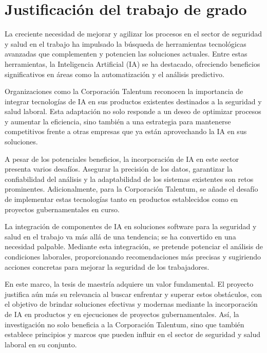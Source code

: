 \section{Justificación del trabajo de grado}
La creciente necesidad de mejorar y agilizar los procesos en el sector de seguridad y salud en el trabajo ha impulsado la búsqueda de herramientas tecnológicas avanzadas que complementen y potencien las soluciones actuales. Entre estas herramientas, la Inteligencia Artificial (IA) se ha destacado, ofreciendo beneficios significativos en áreas como la automatización y el análisis predictivo.

Organizaciones como la Corporación Talentum reconocen la importancia de integrar tecnologías de IA en sus productos existentes destinados a la seguridad y salud laboral. Esta adaptación no solo responde a un deseo de optimizar procesos y aumentar la eficiencia, sino también a una estrategia para mantenerse competitivos frente a otras empresas que ya están aprovechando la IA en sus soluciones.

A pesar de los potenciales beneficios, la incorporación de IA en este sector presenta varios desafíos. Asegurar la precisión de los datos, garantizar la confiabilidad del análisis y la adaptabilidad de los sistemas existentes son retos prominentes. Adicionalmente, para la Corporación Talentum, se añade el desafío de implementar estas tecnologías tanto en productos establecidos como en proyectos gubernamentales en curso.

La integración de componentes de IA en soluciones software para la seguridad y salud en el trabajo va más allá de una tendencia; se ha convertido en una necesidad palpable. Mediante esta integración, se pretende potenciar el análisis de condiciones laborales, proporcionando recomendaciones más precisas y sugiriendo acciones concretas para mejorar la seguridad de los trabajadores.

En este marco, la tesis de maestría adquiere un valor fundamental. El proyecto justifica aún más su relevancia al buscar enfrentar y superar estos obstáculos, con el objetivo de brindar soluciones efectivas y modernas mediante la incorporación de IA en productos y en ejecuciones de proyectos gubernamentales. Así, la investigación no solo beneficia a la Corporación Talentum, sino que también establece principios y marcos que pueden influir en el sector de seguridad y salud laboral en su conjunto.
